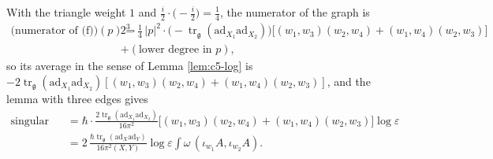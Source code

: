 \begin{example}
\begin{itemize}
\end{itemize}
With the triangle weight $1$ and $\frac i2\cdot\big(-\frac i2\big)=\frac14$, the numerator of the graph is
\[
\begin{aligned}
\big(\text{numerator of (f)}\big)(p)=\ &2^3\cdot\frac14\,|p|^2\cdot\Big(-\operatorname{tr}_{\mathfrak g}(\mathrm{ad}_{X_1}\mathrm{ad}_{X_2})\Big)\Big[(w_1,w_3)(w_2,w_4)+(w_1,w_4)(w_2,w_3)\Big]\\
&+(\text{lower degree in }p),
\end{aligned}
\]
so its average in the sense of Lemma \ref{lem:c5-log} is $-2\operatorname{tr}_{\mathfrak g}(\mathrm{ad}_{X_1}\mathrm{ad}_{X_2})[(w_1,w_3)(w_2,w_4)+(w_1,w_4)(w_2,w_3)]$, and the lemma with three edges gives
\[
\begin{aligned}
\text{singular part of (f)}&=\hbar\cdot\frac{2\operatorname{tr}_{\mathfrak g}(\mathrm{ad}_{X_1}\mathrm{ad}_{X_2})}{16\pi^2}\big[(w_1,w_3)(w_2,w_4)+(w_1,w_4)(w_2,w_3)\big]\log\varepsilon\\
&=2\,\frac{\hbar\operatorname{tr}_{\mathfrak g}(\mathrm{ad}_X\mathrm{ad}_Y)}{16\pi^2(X,Y)}\log\varepsilon\int\omega\,(\iota_{w_1}A,\iota_{w_2}A).
\end{aligned}
\]
\end{example}


